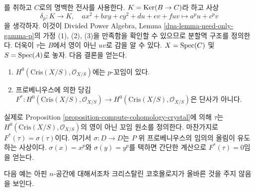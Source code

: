 \begin{example}
$$$$
를 취하고 $C$로의 명백한 전사를 사용한다.
$K = \mathop{\mathrm{Ker}}(B \to C)$라 하고 사상
$$
\delta_p : K \longrightarrow K,\quad
ax^2 + bxy + cy^2 + du + ev + fuv \longmapsto a^pu + c^pv
$$
을 생각하자. 이것이 Divided Power Algebra, Lemma
\ref{dpa-lemma-need-only-gamma-p}의 가정 (1), (2), (3)을
만족함을 확인할 수 있으므로 분할멱 구조를 정의한다. 더욱이
$\tau$는 $B$에서 영이 아닌 $uv$로 감을 알 수 있다.
$X = \mathop{\mathrm{Spec}}(C)$ 및 $S = \mathop{\mathrm{Spec}}(A)$로 놓자. 다음 결론을 얻는다.
\begin{enumerate}
\item $H^0(\text{Cris}(X/S), \mathcal{O}_{X/S})$에는 $p$-꼬임이 있다.
\item 프로베니우스에 의한 당김
$F^* : H^0(\text{Cris}(X/S), \mathcal{O}_{X/S})
\to H^0(\text{Cris}(X/S), \mathcal{O}_{X/S})$은 단사가 아니다.
\end{enumerate}
실제로 Proposition \ref{proposition-compute-cohomology-crystal}에 의해
$\tau$는 $H^0(\text{Cris}(X/S), \mathcal{O}_{X/S})$의 영이 아닌
꼬임 원소를 정의한다. 마찬가지로 $F^*(\tau) = \sigma(\tau)$이다.
여기서 $\sigma : D \to D$는 $P$ 위 프로베니우스의 임의의 올림이
유도하는 사상이다. $\sigma(x) = x^p$와 $\sigma(y) = y^p$를 택하면
간단한 계산으로 $F^*(\tau) = 0$임을 얻는다.
\end{example}

\noindent
다음 예는 아핀 $n$-공간에 대해서조차 크리스탈린 코호몰로지가
올바른 것을 주지 않음을 보인다.


